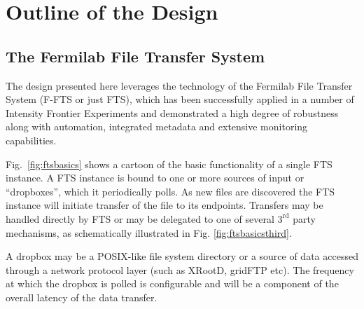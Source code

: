 \documentclass[pdftex,12pt,letter]{article}
\newcommand{\pd}{protoDUNE\ }
\begin{document}

\section{Outline of the Design}


\subsection{The Fermilab File Transfer System}
The design presented here leverages the technology of the Fermilab
File Transfer System (F-FTS or just FTS), which has been successfully
applied in a number of Intensity Frontier Experiments and demonstrated
a high degree of robustness along with automation, integrated metadata
and extensive monitoring capabilities.

Fig.~\ref{fig:ftsbasics} shows a cartoon of the basic functionality
of a single FTS instance.  A FTS instance is bound to one or more
sources of input or ``dropboxes'', which it  periodically polls.
As new files are discovered the FTS instance will initiate transfer of the file to its endpoints.
Transfers may be handled directly by FTS or may be delegated to one of
several $3^\mathrm{rd}$ party mechanisms, as schematically illustrated
in  Fig. \ref{fig:ftsbasicsthird}.

A dropbox may be a POSIX-like file
system directory or a source of data accessed through a network protocol
layer (such as  XRootD, gridFTP etc). The frequency at which the dropbox is
polled is configurable and will be a component of the overall latency
of the data transfer.
\end{document}
